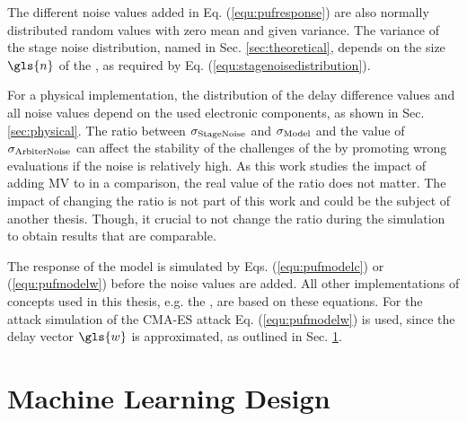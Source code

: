 The different noise values added in Eq. (\ref{equ:pufresponse}) are also normally distributed random values with zero mean and given variance.
The variance of the stage noise distribution, named in Sec. \ref{sec:theoretical}, depends on the size $\gls{n}$ of the \apuf, as required by Eq. (\ref{equ:stagenoisedistribution}).

For a physical \apuf implementation, the distribution of the delay difference values and all noise values depend on the used electronic components, as shown in Sec. \ref{sec:physical}.
The ratio between $\sigma_{\mathrm{Stage Noise}}$ and $\sigma_{\mathrm{Model}}$ and the value of $\sigma_{\mathrm{Arbiter Noise}}$ can affect the stability of the challenges of the \apuf by promoting wrong \puf evaluations if the noise is relatively high.
As this work studies the impact of adding \ac{MV} to \apufs in a comparison, the real value of the ratio does not matter.
The impact of changing the ratio is not part of this work and could be the subject of another thesis. 
Though, it crucial to not change the ratio during the simulation to obtain results that are comparable.

The response of the \apuf model is simulated by Eqs. (\ref{equ:pufmodelc}) or (\ref{equ:pufmodelw}) before the noise values are added.
All other implementations of \puf concepts used in this thesis, e.g. the \mpuf, are based on these \apuf equations.
For the attack simulation of the \ac{CMA-ES} attack Eq. (\ref{equ:pufmodelw}) is used, since the delay vector $\gls{w}$ is approximated, as outlined in Sec. \ref{sec:machinelearningdesign}.


\section{Machine Learning Design}
\label{sec:machinelearningdesign}


